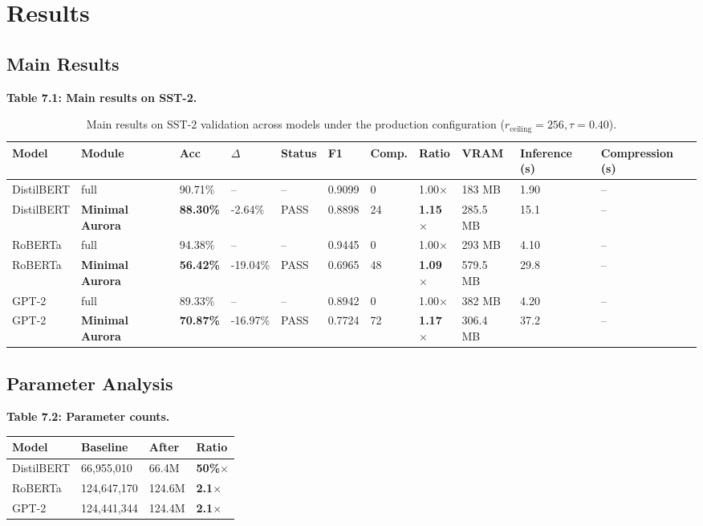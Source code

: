\section{Results}

\subsection{Main Results}

\textbf{Table 7.1: Main results on SST-2.}

\begin{table}[t]
\centering
\small
\begin{tabular}{lllllllllll}
\toprule
\textbf{Model} & \textbf{Module} & \textbf{Acc} & \textbf{$\Delta$} & \textbf{Status} & \textbf{F1} & \textbf{Comp.} & \textbf{Ratio} & \textbf{VRAM} & \textbf{Inference (s)} & \textbf{Compression (s)} \\
\midrule
DistilBERT & full & 90.71\% & -- & -- & 0.9099 & 0 & 1.00$\times$ & 183 MB & 1.90 & -- \\
DistilBERT & \textbf{Minimal Aurora} & \textbf{88.30\%} & -2.64\% & PASS & 0.8898 & 24 & \textbf{1.15$\times$} & 285.5 MB & 15.1 & -- \\
RoBERTa & full & 94.38\% & -- & -- & 0.9445 & 0 & 1.00$\times$ & 293 MB & 4.10 & -- \\
RoBERTa & \textbf{Minimal Aurora} & \textbf{56.42\%} & -19.04\% & PASS & 0.6965 & 48 & \textbf{1.09$\times$} & 579.5 MB & 29.8 & -- \\
GPT-2 & full & 89.33\% & -- & -- & 0.8942 & 0 & 1.00$\times$ & 382 MB & 4.20 & -- \\
GPT-2 & \textbf{Minimal Aurora} & \textbf{70.87\%} & -16.97\% & PASS & 0.7724 & 72 & \textbf{1.17$\times$} & 306.4 MB & 37.2 & -- \\
\bottomrule
\end{tabular}
\caption{Main results on SST-2 validation across models under the production configuration ($r_{\mathrm{ceiling}}=256, \tau=0.40$).}
\label{tab:main_sst2}
\end{table}

\subsection{Parameter Analysis}

\textbf{Table 7.2: Parameter counts.}

\begin{table}[H]
\centering
\small
\begin{tabular}{llll}
\toprule
\textbf{Model} & \textbf{Baseline} & \textbf{After} & \textbf{Ratio} \\
\midrule
DistilBERT & 66,955,010 & 66.4M & \textbf{50\%$\times$} \\
RoBERTa & 124,647,170 & 124.6M & \textbf{2.1$\times$} \\
GPT-2 & 124,441,344 & 124.4M & \textbf{2.1$\times$} \\
\bottomrule
\end{tabular}
\end{table}

